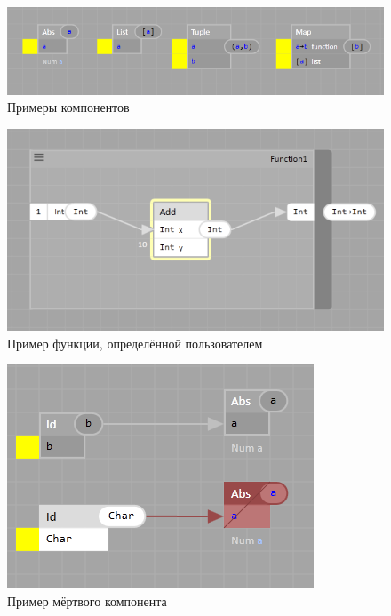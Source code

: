 \begin{figure}[h]
	\centering
	\includegraphics{img/components.PNG}
	\caption{Примеры компонентов}\label{components}	
\end{figure}
\begin{figure}[h]
	\centering
	\includegraphics{img/custom_function.PNG}
	\caption{Пример функции, определённой пользователем}\label{customfun}	
\end{figure}
\begin{figure}[h]
	\centering
	\includegraphics{img/dead.PNG}
	\caption{Пример мёртвого компонента}\label{dead}
\end{figure}


